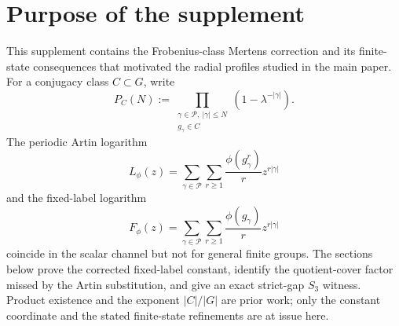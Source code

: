 \section{Purpose of the supplement}

This supplement contains the Frobenius-class Mertens correction and its
finite-state consequences that motivated the radial profiles studied in the
main paper.  For a conjugacy class \(C\subset G\), write
\begin{equation}\label{eq:intro-class-product}
 P_C(N):=
 \prod_{\substack{\gamma\in\mathcal P,\ |\gamma|\le N\\g_\gamma\in C}}
 \left(1-\lambda^{-|\gamma|}\right).
\end{equation}
The periodic Artin logarithm
\begin{equation}\label{eq:intro-artin}
 L_\phi(z)=\sum_{\gamma\in\mathcal P}\sum_{r\ge1}
 \frac{\phi(g_\gamma^r)}r z^{r|\gamma|}
\end{equation}
and the fixed-label logarithm
\begin{equation}\label{eq:intro-fixed}
 F_\phi(z)=\sum_{\gamma\in\mathcal P}\sum_{r\ge1}
 \frac{\phi(g_\gamma)}r z^{r|\gamma|}
\end{equation}
coincide in the scalar channel but not for general finite groups.  The
sections below prove the corrected fixed-label constant, identify the
quotient-cover factor missed by the Artin substitution, and give an exact
strict-gap \(S_3\) witness.  Product existence and the exponent
\(|C|/|G|\) are prior work; only the constant coordinate and the stated
finite-state refinements are at issue here.
